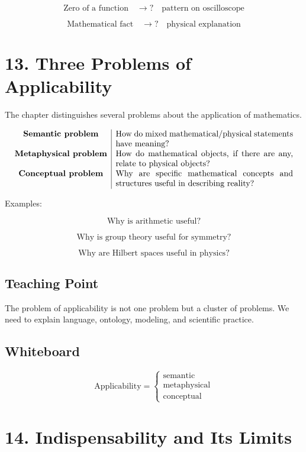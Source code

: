 \documentclass[11pt]{article}
\begin{document}
\[
\text{Zero of a function}
\quad \longrightarrow ? \quad
\text{pattern on oscilloscope}
\]

\[
\text{Mathematical fact}
\quad \longrightarrow ? \quad
\text{physical explanation}
\]

\section*{13. Three Problems of Applicability}

The chapter distinguishes several problems about the application of mathematics.

\[
\begin{array}{c|p{0.62\textwidth}}
\textbf{Semantic problem} &
How do mixed mathematical/physical statements have meaning? \\

\textbf{Metaphysical problem} &
How do mathematical objects, if there are any, relate to physical objects? \\

\textbf{Conceptual problem} &
Why are specific mathematical concepts and structures useful in describing reality?
\end{array}
\]

Examples:

\[
\text{Why is arithmetic useful?}
\]

\[
\text{Why is group theory useful for symmetry?}
\]

\[
\text{Why are Hilbert spaces useful in physics?}
\]

\subsection*{Teaching Point}

The problem of applicability is not one problem but a cluster of problems. We need to
explain language, ontology, modeling, and scientific practice.

\subsection*{Whiteboard}

\[
\text{Applicability}
=
\begin{cases}
\text{semantic} \\
\text{metaphysical} \\
\text{conceptual}
\end{cases}
\]

\section*{14. Indispensability and Its Limits}
\end{document}
